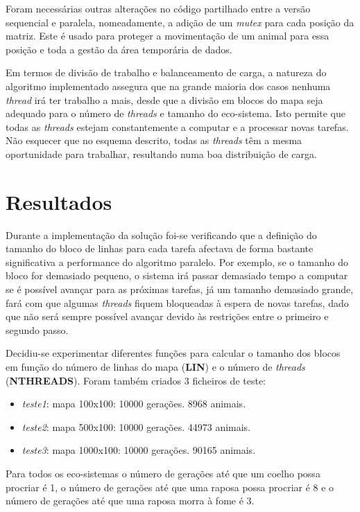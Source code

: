\documentclass[12pt]{article}
\begin{document}
Foram necessárias outras alterações no código partilhado entre a versão sequencial e paralela, nomeadamente,
a adição de um \textit{mutex} para cada posição da matriz. Este é usado para proteger a movimentação
de um animal para essa posição e toda a gestão da área temporária de dados.

Em termos de divisão de trabalho e balanceamento de carga, a natureza do algoritmo implementado
assegura que na grande maioria dos casos nenhuma \textit{thread} irá ter trabalho a mais,
desde que a divisão em blocos do mapa seja adequado para o número de \textit{threads} e tamanho do eco-sistema.
Isto permite que todas as \textit{threads} estejam constantemente a computar e a processar
novas tarefas. Não esquecer que no esquema descrito, todas as \textit{threads} têm a mesma oportunidade
para trabalhar, resultando numa boa distribuição de carga.

\section{Resultados}

Durante a implementação da solução foi-se verificando que a definição do tamanho do bloco de linhas
para cada tarefa afectava de forma bastante significativa a performance do algoritmo paralelo.
Por exemplo, se o tamanho do bloco for demasiado pequeno, o sistema irá passar demasiado tempo
a computar se é possível avançar para as próximas tarefas, já um tamanho demasiado grande,
fará com que algumas \textit{threads} fiquem bloqueadas à espera de novas tarefas, dado que não será sempre
possível avançar devido às restrições entre o primeiro e segundo passo.

Decidiu-se experimentar diferentes funções para calcular o tamanho dos blocos em função do número de linhas
do mapa (\textbf{LIN}) e o número de \textit{threads} (\textbf{NTHREADS}).
Foram também criados 3 ficheiros de teste:

\begin{itemize}
  \item \textit{teste1}: mapa 100x100: 10000 gerações. 8968 animais.
  \item \textit{teste2}: mapa 500x100: 10000 gerações. 44973 animais.
  \item \textit{teste3}: mapa 1000x100: 10000 gerações. 90165 animais.
\end{itemize}

Para todos os eco-sistemas o número de gerações até que um coelho possa procriar é 1, o número
de gerações até que uma raposa possa procriar é 8 e o número de gerações até que uma raposa morra à fome é 3.
\end{document}
